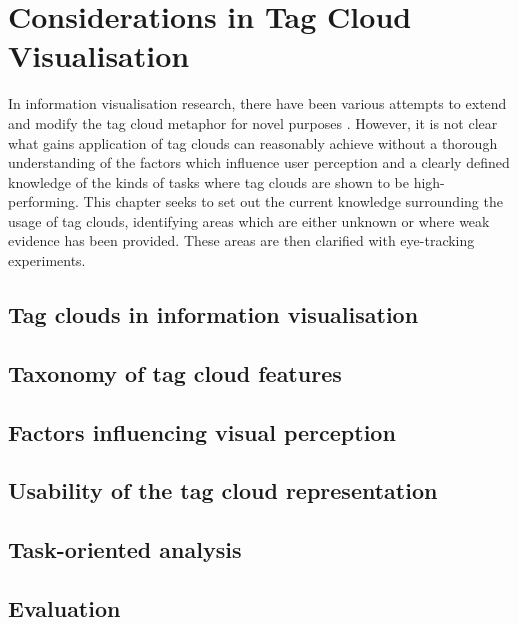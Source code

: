 \chapter{Considerations in Tag Cloud Visualisation}
\ifpdf
    \graphicspath{{Chapter2/Chapter2Figs/PNG/}{Chapter2/Chapter2Figs/PDF/}{Chapter2/Chapter2Figs/}}
\else
    \graphicspath{{Chapter2/Chapter2Figs/EPS/}{Chapter2/Chapter2Figs/}}
\fi

In information visualisation research, there have been various attempts to extend and modify the tag cloud metaphor for novel purposes \citep[such as][]{Candan08, Cui10, dicaro08, lee10} . However, it is not clear what gains application of tag clouds can reasonably achieve without a thorough understanding of the factors which influence user perception and a clearly defined knowledge of the kinds of tasks where tag clouds are shown to be high-performing. This chapter seeks to set out the current knowledge surrounding the usage of tag clouds, identifying areas which are either unknown or where weak evidence has been provided. These areas are then clarified with eye-tracking experiments.

\section{Tag clouds in information visualisation}


\section{Taxonomy of tag cloud features}


\section{Factors influencing visual perception}


\section{Usability of the tag cloud representation}


\section{Task-oriented analysis}


\section{Evaluation}





